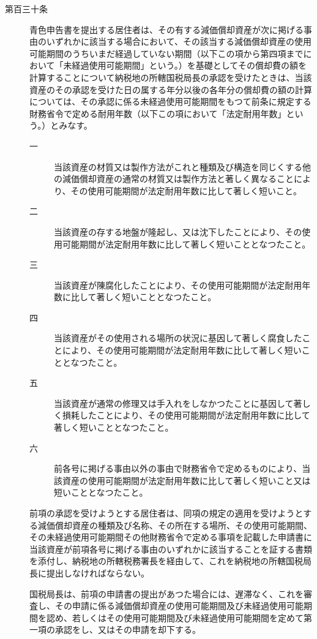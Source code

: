 \documentclass[twocolumn,a4j,10pt]{ltjtarticle}
\begin{document}
\begin{description}
\item[第百三十条]青色申告書を提出する居住者は、その有する減価償却資産が次に掲げる事由のいずれかに該当する場合において、その該当する減価償却資産の使用可能期間のうちいまだ経過していない期間（以下この項から第四項までにおいて「未経過使用可能期間」という。）を基礎としてその償却費の額を計算することについて納税地の所轄国税局長の承認を受けたときは、当該資産のその承認を受けた日の属する年分以後の各年分の償却費の額の計算については、その承認に係る未経過使用可能期間をもつて前条に規定する財務省令で定める耐用年数（以下この項において「法定耐用年数」という。）とみなす。
\begin{description}
\item[一]当該資産の材質又は製作方法がこれと種類及び構造を同じくする他の減価償却資産の通常の材質又は製作方法と著しく異なることにより、その使用可能期間が法定耐用年数に比して著しく短いこと。
\item[二]当該資産の存する地盤が隆起し、又は沈下したことにより、その使用可能期間が法定耐用年数に比して著しく短いこととなつたこと。
\item[三]当該資産が陳腐化したことにより、その使用可能期間が法定耐用年数に比して著しく短いこととなつたこと。
\item[四]当該資産がその使用される場所の状況に基因して著しく腐食したことにより、その使用可能期間が法定耐用年数に比して著しく短いこととなつたこと。
\item[五]当該資産が通常の修理又は手入れをしなかつたことに基因して著しく損耗したことにより、その使用可能期間が法定耐用年数に比して著しく短いこととなつたこと。
\item[六]前各号に掲げる事由以外の事由で財務省令で定めるものにより、当該資産の使用可能期間が法定耐用年数に比して著しく短いこと又は短いこととなつたこと。
\end{description}
\item[]前項の承認を受けようとする居住者は、同項の規定の適用を受けようとする減価償却資産の種類及び名称、その所在する場所、その使用可能期間、その未経過使用可能期間その他財務省令で定める事項を記載した申請書に当該資産が前項各号に掲げる事由のいずれかに該当することを証する書類を添付し、納税地の所轄税務署長を経由して、これを納税地の所轄国税局長に提出しなければならない。
\item[]国税局長は、前項の申請書の提出があつた場合には、遅滞なく、これを審査し、その申請に係る減価償却資産の使用可能期間及び未経過使用可能期間を認め、若しくはその使用可能期間及び未経過使用可能期間を定めて第一項の承認をし、又はその申請を却下する。

\end{description}
\end{document}
